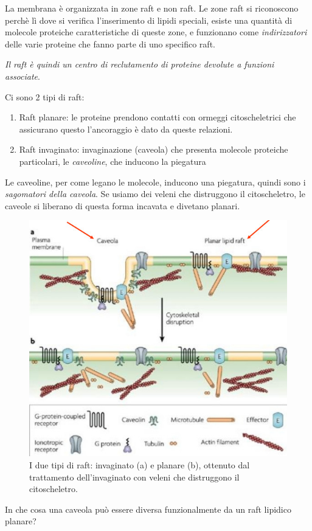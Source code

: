 \documentclass[a4paper,12pt]{article}
\begin{document}
La membrana è organizzata in zone raft e non raft. Le zone raft si riconoscono perchè lì dove si verifica l'inserimento di lipidi speciali, esiste una quantità di molecole proteiche caratteristiche di queste zone, e funzionano come \emph{indirizzatori} delle varie proteine che fanno parte di uno specifico raft.

\emph{Il raft è quindi un centro di reclutamento di proteine devolute a funzioni associate}.

Ci sono 2 tipi di raft:
\begin{enumerate}
\item{Raft planare: le proteine prendono contatti con ormeggi citoscheletrici che assicurano questo l'ancoraggio è
dato da queste relazioni.}
\item{Raft invaginato: invaginazione (caveola) che presenta molecole proteiche particolari, le \emph{caveoline}, che inducono la piegatura}
\end{enumerate}

Le caveoline, per come legano le molecole, inducono una piegatura, quindi sono i \emph{sagomatori della caveola}. Se usiamo dei veleni che distruggono il citoscheletro, le caveole si liberano di questa forma incavata e divetano planari.
\begin{figure}[H]
\centering
\includegraphics[scale=0.5]{immagine/raft1.jpg}
\caption{I due tipi di raft: invaginato (a) e planare (b), ottenuto dal trattamento dell'invaginato con veleni che distruggono il citoscheletro.}
\end{figure}
In che cosa una caveola può essere diversa funzionalmente da un raft lipidico planare? 
\end{document}
